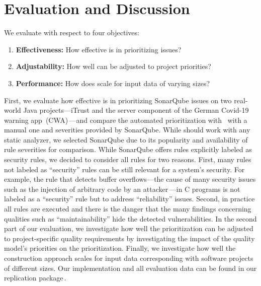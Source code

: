 \section{Evaluation and Discussion}
\label{sec:eval}

We evaluate \appr{} with respect to four objectives:

\begin{enumerate}[label=\textbf{O\arabic*:}, ref=O\arabic*]
    \item \textbf{Effectiveness:}
   		How effective is \appr{} in prioritizing issues?\label{o1}
    \item \textbf{Adjustability:}
    	How well can \appr{} be adjusted to project priorities?\label{o2}
    \item \textbf{Performance:}
   		How does \appr{} scale for input data of varying sizes?\label{o3}
\end{enumerate}

First, we evaluate how effective \appr{} is in prioritizing SonarQube issues on two real-world Java projects---iTrust and the server component of the German Covid-19 warning app~(CWA)\,\cite{cwa-server}---and compare the automated prioritization with \appr\ with a manual one and severities provided by SonarQube.
While \appr{} should work with any static analyzer, we selected SonarQube due to its popularity and availability of rule severities for comparison.
While SonarQube offers rules explicitly labeled as security rules, we decided to consider all rules for two reasons.
First, many rules not labeled as ``security'' rules can be still relevant for a system's security. For example, the rule that detects buffer overflows---the cause of many security issues such as the injection of arbitrary code by an attacker\,\cite{Cowan2000}---in C programs is not labeled as a ``security'' rule but to address ``reliability'' issues.
Second, in practice all rules are executed and there is the danger that the many findings concerning qualities such as ``maintainability'' hide the detected vulnerabilities.
In the second part of our evaluation, we investigate how well the prioritization can be adjusted to project-specific quality requirements by investigating the impact of the quality model's priorities on the prioritization.
Finally, we investigate how well the construction approach scales for input data corresponding with software projects of different sizes.
Our implementation and all evaluation data can be found in our replication package\,\cite{replication}.


